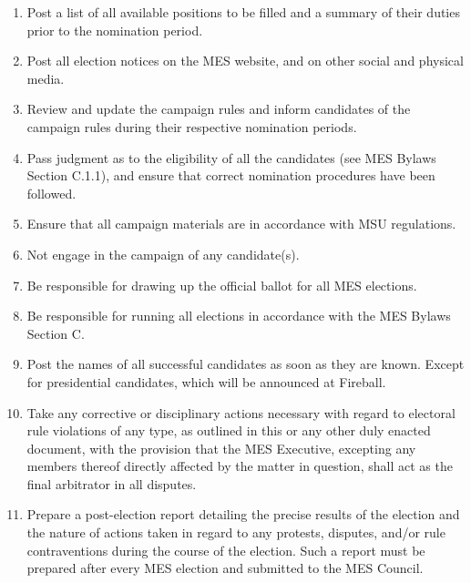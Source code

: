 \begin{enumerate}
  \begin{enumerate}
   \item
    Post a list of all available positions to be filled and a summary of
    their duties prior to the nomination period.
   \item
    Post all election notices on the MES website, and on other social
    and physical media.
   \item
    Review and update the campaign rules and inform candidates of the
    campaign rules during their respective nomination periods.
   \item
    Pass judgment as to the eligibility of all the candidates (see MES
    Bylaws Section C.1.1), and ensure that correct nomination procedures
    have been followed.
   \item
    Ensure that all campaign materials are in accordance with MSU
    regulations.
   \item
    Not engage in the campaign of any candidate(s).
   \item
    Be responsible for drawing up the official ballot for all MES
    elections.
   \item
    Be responsible for running all elections in accordance with the MES
    Bylaws Section C.
   \item
    Post the names of all successful candidates as soon as they are
    known. Except for presidential candidates, which will be announced
    at Fireball.
   \item
    Take any corrective or disciplinary actions necessary with regard to
    electoral rule violations of any type, as outlined in this or any
    other duly enacted document, with the provision that the MES
    Executive, excepting any members thereof directly affected by the
    matter in question, shall act as the final arbitrator in all
    disputes.
   \item
    Prepare a post-election report detailing the precise results of the
    election and the nature of actions taken in regard to any protests,
    disputes, and/or rule contraventions during the course of the
    election. Such a report must be prepared after every MES election
    and submitted to the MES Council.
  \end{enumerate}
\end{enumerate}

